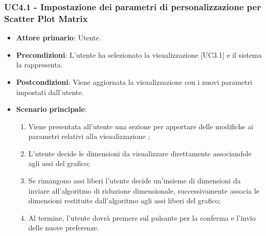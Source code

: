 \subsubsection{UC4.1 - Impostazione dei parametri di personalizzazione per Scatter Plot Matrix}
\begin{itemize}
	\item \textbf{Attore primario}: Utente.
	\item \textbf{Precondizioni}: L'utente ha selezionato la visualizzazione  [UC3.1] e il sistema la rappresenta.
	\item \textbf{Postcondizioni}: Viene aggiornata la visualizzazione  con i nuovi parametri impostati dall'utente.
	\item \textbf{Scenario principale}:
	\begin{enumerate}
			\item Viene presentata all'utente una sezione per apportare delle modifiche ai parametri relativi alla visualizzazione ;
			\item L'utente decide le dimensioni da visualizzare direttamente associandole agli assi del grafico;
			\item Se rimangono assi liberi l'utente decide un'insieme di dimensioni da inviare all'algoritmo di riduzione dimensionale, successivamente associa le dimensioni restituite dall'algoritmo agli assi liberi del grafico;
			\item Al termine, l'utente dovrà premere sul pulsante per la conferma e l'invio delle nuove preferenze.
		\end{enumerate}
\end{itemize}